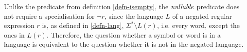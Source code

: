 Unlike the predicate from definition \ref{defn-isempty}, the $\mathit{nullable}$
predicate does not require a specialisation for $\neg r$, since the language $L$
of a negated regular expression $r$ is, as defined in \ref{defn-lang}, $\Sigma^*
\setminus L(r)$, i.e. every word, except the ones in $L(r)$. Therefore, the
question whether a symbol or word is in a language is equivalent to the question
whether it is not in the negated language.


